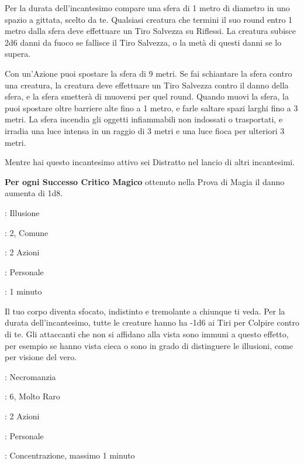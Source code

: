 \begin{multicols}{2}
Per la durata dell'incantesimo compare una sfera di 1 metro di diametro in uno spazio a gittata, scelto da te. Qualsiasi creatura che termini il suo round entro 1 metro dalla sfera deve effettuare un Tiro Salvezza su Riflessi. La creatura subisce 2d6 danni da fuoco se fallisce il Tiro Salvezza, o la metà di questi danni se lo supera.

Con un'Azione puoi spostare la sfera di 9 metri. Se fai schiantare la sfera contro una creatura, la creatura deve effettuare un Tiro Salvezza contro il danno della sfera, e la sfera smetterà di muoversi per quel round.
Quando muovi la sfera, la puoi spostare oltre barriere alte fino a 1 metro, e farle saltare spazi larghi fino a 3 metri. La sfera incendia gli oggetti infiammabili non indossati o trasportati, e irradia una luce intensa in un raggio di 3 metri e una luce fioca per ulteriori 3 metri.

Mentre hai questo incantesimo attivo sei Distratto nel lancio di altri incantesimi.

\textbf{Per ogni Successo Critico Magico} ottenuto nella Prova di Magia il danno aumenta di 1d8.

\noindent\colorbox{OBSSgold!10}{
\begin{minipage}{0.95\linewidth}
\begin{description}[noitemsep, topsep=0pt, parsep=0pt, partopsep=0pt, leftmargin=0cm, labelwidth=1.3cm]
	\item[\textbf{Lista}]: Illusione
	\item[\textbf{Livello}]: 2, Comune
	\item[\textbf{Lancio}]: 2 Azioni
	\item[\textbf{Gittata}]: Personale
	\item[\textbf{Durata}]: 1 minuto
\end{description}
\end{minipage}}\smallskip

Il tuo corpo diventa sfocato, indistinto e tremolante a chiunque ti veda. Per la durata dell'incantesimo, tutte le creature hanno ha -1d6 ai Tiri per Colpire contro di te. Gli attaccanti che non si affidano alla vista sono immuni a questo effetto, per esempio se hanno vista cieca o sono in grado di distinguere le illusioni, come per visione del vero.

\noindent\colorbox{OBSSgold!10}{
\begin{minipage}{0.95\linewidth}
\begin{description}[noitemsep, topsep=0pt, parsep=0pt, partopsep=0pt, leftmargin=0cm, labelwidth=1.3cm]
	\item[\textbf{Lista}]: Necromanzia
	\item[\textbf{Livello}]: 6, Molto Raro
	\item[\textbf{Lancio}]: 2 Azioni
	\item[\textbf{Gittata}]: Personale
	\item[\textbf{Durata}]: Concentrazione, massimo 1 minuto
\end{description}
\end{minipage}}\smallskip


\end{multicols}
